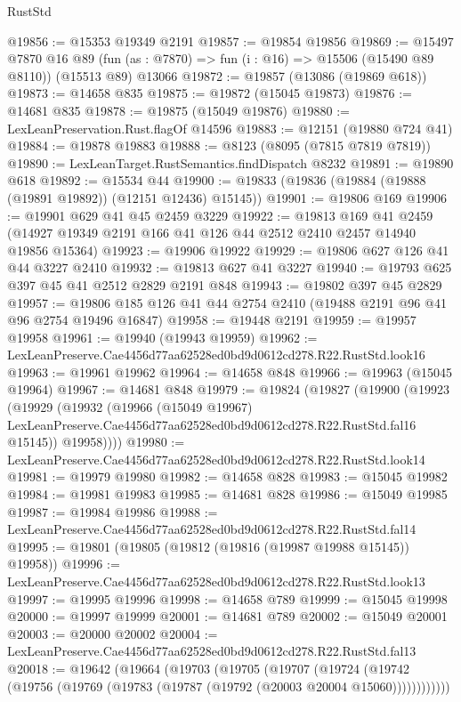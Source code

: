 \begin{lexlean}{RustStd}
\begin{coremodule}
@19856 := @15353 @19349 @2191
@19857 := @19854 @19856
@19869 := @15497
    @7870
    @16
    @89
    (fun (as : @7870) => fun (i : @16) => @15506 (@15490 @89 @8110))
    (@15513 @89)
    @13066
@19872 := @19857 (@13086 (@19869 @618))
@19873 := @14658 @835
@19875 := @19872 (@15045 @19873)
@19876 := @14681 @835
@19878 := @19875 (@15049 @19876)
@19880 := LexLeanPreservation.Rust.flagOf @14596
@19883 := @12151 (@19880 @724 @41)
@19884 := @19878 @19883
@19888 := @8123 (@8095 (@7815 @7819 @7819))
@19890 := LexLeanTarget.RustSemantics.findDispatch @8232
@19891 := @19890 @618
@19892 := @15534 @44
@19900 := @19833 (@19836 (@19884 (@19888 (@19891 @19892)) (@12151 @12436) @15145))
@19901 := @19806 @169
@19906 := @19901 @629 @41 @45 @2459 @3229
@19922 := @19813
    @169
    @41
    @2459
    (@14927 @19349 @2191 @166 @41 @126 @44 @2512 @2410 @2457 @14940 @19856 @15364)
@19923 := @19906 @19922
@19929 := @19806 @627 @126 @41 @44 @3227 @2410
@19932 := @19813 @627 @41 @3227
@19940 := @19793 @625 @397 @45 @41 @2512 @2829 @2191 @848
@19943 := @19802 @397 @45 @2829
@19957 := @19806 @185 @126 @41 @44 @2754 @2410 (@19488 @2191 @96 @41 @96 @2754 @19496 @16847)
@19958 := @19448 @2191
@19959 := @19957 @19958
@19961 := @19940 (@19943 @19959)
@19962 := LexLeanPreserve.Cae4456d77aa62528ed0bd9d0612cd278.R22.RustStd.look16
@19963 := @19961 @19962
@19964 := @14658 @848
@19966 := @19963 (@15045 @19964)
@19967 := @14681 @848
@19979 := @19824
    (@19827
      (@19900
        (@19923
          (@19929
            (@19932
              (@19966
                (@15049 @19967)
                LexLeanPreserve.Cae4456d77aa62528ed0bd9d0612cd278.R22.RustStd.fal16
                @15145))
            @19958))))
@19980 := LexLeanPreserve.Cae4456d77aa62528ed0bd9d0612cd278.R22.RustStd.look14
@19981 := @19979 @19980
@19982 := @14658 @828
@19983 := @15045 @19982
@19984 := @19981 @19983
@19985 := @14681 @828
@19986 := @15049 @19985
@19987 := @19984 @19986
@19988 := LexLeanPreserve.Cae4456d77aa62528ed0bd9d0612cd278.R22.RustStd.fal14
@19995 := @19801 (@19805 (@19812 (@19816 (@19987 @19988 @15145)) @19958))
@19996 := LexLeanPreserve.Cae4456d77aa62528ed0bd9d0612cd278.R22.RustStd.look13
@19997 := @19995 @19996
@19998 := @14658 @789
@19999 := @15045 @19998
@20000 := @19997 @19999
@20001 := @14681 @789
@20002 := @15049 @20001
@20003 := @20000 @20002
@20004 := LexLeanPreserve.Cae4456d77aa62528ed0bd9d0612cd278.R22.RustStd.fal13
@20018 := @19642
    (@19664
      (@19703
        (@19705
          (@19707
            (@19724
              (@19742 (@19756 (@19769 (@19783 (@19787 (@19792 (@20003 @20004 @15060))))))))))))

\end{coremodule}
\end{lexlean}
